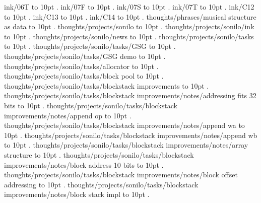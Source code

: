 ink/06T \leaders\hbox to 10pt {\hss.\hss}  \hfill {}
\smallskip
ink/07F \leaders\hbox to 10pt {\hss.\hss}  \hfill {}
\smallskip
ink/07S \leaders\hbox to 10pt {\hss.\hss}  \hfill {}
\smallskip
ink/07T \leaders\hbox to 10pt {\hss.\hss}  \hfill {}
\smallskip
ink/C12 \leaders\hbox to 10pt {\hss.\hss}  \hfill {}
\smallskip
ink/C13 \leaders\hbox to 10pt {\hss.\hss}  \hfill {}
\smallskip
ink/C14 \leaders\hbox to 10pt {\hss.\hss}  \hfill {}
\smallskip
thoughts/phrases/musical structure as data \leaders\hbox to 10pt {\hss.\hss}  \hfill {}
\smallskip
thoughts/projects/sonilo \leaders\hbox to 10pt {\hss.\hss}  \hfill {}
\smallskip
thoughts/projects/sonilo/ink \leaders\hbox to 10pt {\hss.\hss}  \hfill {}
\smallskip
thoughts/projects/sonilo/news \leaders\hbox to 10pt {\hss.\hss}  \hfill {}
\smallskip
thoughts/projects/sonilo/tasks \leaders\hbox to 10pt {\hss.\hss}  \hfill {}
\smallskip
thoughts/projects/sonilo/tasks/GSG \leaders\hbox to 10pt {\hss.\hss}  \hfill {}
\smallskip
thoughts/projects/sonilo/tasks/GSG demo \leaders\hbox to 10pt {\hss.\hss}  \hfill {}
\smallskip
thoughts/projects/sonilo/tasks/allocator \leaders\hbox to 10pt {\hss.\hss}  \hfill {}
\smallskip
thoughts/projects/sonilo/tasks/block pool \leaders\hbox to 10pt {\hss.\hss}  \hfill {}
\smallskip
thoughts/projects/sonilo/tasks/blockstack improvements \leaders\hbox to 10pt {\hss.\hss}  \hfill {}
\smallskip
thoughts/projects/sonilo/tasks/blockstack improvements/notes/addressing fits 32 bits \leaders\hbox to 10pt {\hss.\hss}  \hfill {}
\smallskip
thoughts/projects/sonilo/tasks/blockstack improvements/notes/append op \leaders\hbox to 10pt {\hss.\hss}  \hfill {}
\smallskip
thoughts/projects/sonilo/tasks/blockstack improvements/notes/append wa \leaders\hbox to 10pt {\hss.\hss}  \hfill {}
\smallskip
thoughts/projects/sonilo/tasks/blockstack improvements/notes/append wb \leaders\hbox to 10pt {\hss.\hss}  \hfill {}
\smallskip
thoughts/projects/sonilo/tasks/blockstack improvements/notes/array structure \leaders\hbox to 10pt {\hss.\hss}  \hfill {}
\smallskip
thoughts/projects/sonilo/tasks/blockstack improvements/notes/block address 10 bits \leaders\hbox to 10pt {\hss.\hss}  \hfill {}
\smallskip
thoughts/projects/sonilo/tasks/blockstack improvements/notes/block offset addressing \leaders\hbox to 10pt {\hss.\hss}  \hfill {}
\smallskip
thoughts/projects/sonilo/tasks/blockstack improvements/notes/block stack impl \leaders\hbox to 10pt {\hss.\hss}  \hfill {}
